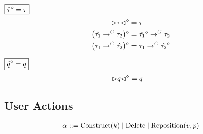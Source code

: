 \noindent $\boxed{\hat{\tau}\mathclose{}^{\diamond}\mathclose{} = \tau}$
%
\begin{align*}
  \erase{\cursor{\tau}} &= \tau \\
  \erase{\left(\tArrow{G}{\hat{\tau_1}}{\tau_2}\right)} &= \tArrow{G}{\erase{\hat{\tau_1}}}{\tau_2} \\
  \erase{\left(\tArrow{G}{\tau_1}{\hat{\tau_2}}\right)} &= \tArrow{G}{\tau_1}{\erase{\hat{\tau_2}}}
\end{align*}

\noindent $\boxed{\hat{q}\mathclose{}^{\diamond}\mathclose{} = q}$
%
\begin{align*}
  {\vartriangleright}q{\vartriangleleft}\mathclose{}^{\diamond}\mathclose{} &= q
\end{align*}


\subsection{User Actions}

\[
  \arraycolsep=0pt
  \begin{array}{llll}
    \alpha & {}::={} &
      \Construct{k}
      \mid \Delete
      \mid \Reposition{v, p}
    \\
  \end{array}
\]



